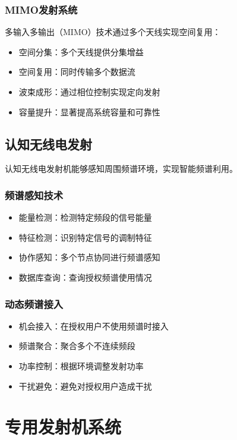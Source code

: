 \documentclass[12pt,UTF8]{ctexbook}
\begin{document}
\subsection{MIMO发射系统}
多输入多输出（MIMO）技术通过多个天线实现空间复用：
\begin{itemize}[leftmargin=3.5em]
    \item 空间分集：多个天线提供分集增益
    \item 空间复用：同时传输多个数据流
    \item 波束成形：通过相位控制实现定向发射
    \item 容量提升：显著提高系统容量和可靠性
\end{itemize}

\section{认知无线电发射}

认知无线电发射机能够感知周围频谱环境，实现智能频谱利用。

\subsection{频谱感知技术}
\begin{itemize}[leftmargin=3.5em]
    \item 能量检测：检测特定频段的信号能量
    \item 特征检测：识别特定信号的调制特征
    \item 协作感知：多个节点协同进行频谱感知
    \item 数据库查询：查询授权频谱使用情况
\end{itemize}

\subsection{动态频谱接入}
\begin{itemize}[leftmargin=3.5em]
    \item 机会接入：在授权用户不使用频谱时接入
    \item 频谱聚合：聚合多个不连续频段
    \item 功率控制：根据环境调整发射功率
    \item 干扰避免：避免对授权用户造成干扰
\end{itemize}

\chapter{专用发射机系统}
\end{document}
